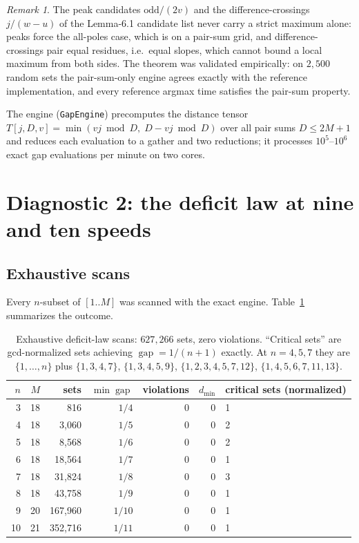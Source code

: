 \documentclass[11pt,a4paper]{article}
\theoremstyle{plain}
\theoremstyle{definition}
\theoremstyle{remark}
\newtheorem{remark}[theorem]{Remark}
\newcommand{\gap}{\operatorname{gap}}
\begin{document}
\begin{remark}
The peak candidates $\mathrm{odd}/(2v)$ and the difference-crossings $j/(w - u)$ of the
Lemma-6.1 candidate list never carry a strict maximum alone: peaks force the all-poles
case, which is on a pair-sum grid, and difference-crossings pair equal residues, i.e.\
equal slopes, which cannot bound a local maximum from both sides. The theorem was
validated empirically: on $2{,}500$ random sets the pair-sum-only engine agrees exactly
with the reference implementation, and every reference argmax time satisfies the
pair-sum property.
\end{remark}

The engine (\texttt{GapEngine}) precomputes the distance tensor
$T[j, D, v] = \min(vj \bmod D,\; D - vj \bmod D)$ over all pair sums $D \le 2M + 1$ and
reduces each evaluation to a gather and two reductions; it processes $10^5$--$10^6$
exact gap evaluations per minute on two cores.

\section{Diagnostic 2: the deficit law at nine and ten speeds}\label{sec:t2}

\subsection{Exhaustive scans}

Every $n$-subset of $[1..M]$ was scanned with the exact engine. Table~\ref{tab:scan}
summarizes the outcome.

\begin{table}[ht]
\centering\small
\begin{tabular}{rrrrrrl}
\toprule
$n$ & $M$ & sets & $\min \gap$ & violations & $d_{\min}$ & critical sets (normalized) \\
\midrule
3 & 18 & 816 & $1/4$ & 0 & 0 & 1 \\
4 & 18 & 3{,}060 & $1/5$ & 0 & 0 & 2 \\
5 & 18 & 8{,}568 & $1/6$ & 0 & 0 & 2 \\
6 & 18 & 18{,}564 & $1/7$ & 0 & 0 & 1 \\
7 & 18 & 31{,}824 & $1/8$ & 0 & 0 & 3 \\
8 & 18 & 43{,}758 & $1/9$ & 0 & 0 & 1 \\
9 & 20 & 167{,}960 & $1/10$ & 0 & 0 & 1 \\
10 & 21 & 352{,}716 & $1/11$ & 0 & 0 & 1 \\
\bottomrule
\end{tabular}
\caption{Exhaustive deficit-law scans: $627{,}266$ sets, zero violations. ``Critical
sets'' are gcd-normalized sets achieving $\gap = 1/(n+1)$ exactly. At $n = 4, 5, 7$
they are $\{1,\dots,n\}$ plus $\{1,3,4,7\}$, $\{1,3,4,5,9\}$,
$\{1,2,3,4,5,7,12\}$, $\{1,4,5,6,7,11,13\}$.}
\label{tab:scan}
\end{table}
\end{document}
